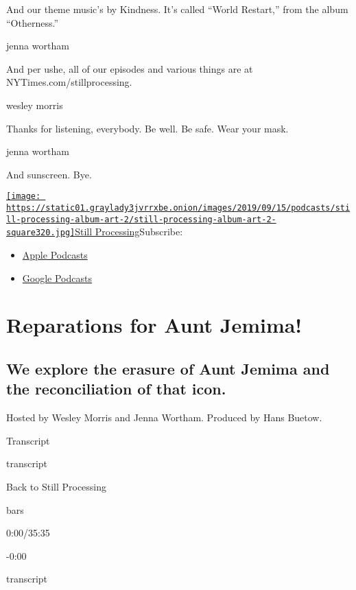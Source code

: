And our theme music's by Kindness. It's called ``World Restart,'' from
the album ``Otherness.''

jenna wortham

And per ushe, all of our episodes and various things are at
NYTimes.com/stillprocessing.

wesley morris

Thanks for listening, everybody. Be well. Be safe. Wear your mask.

jenna wortham

And sunscreen. Bye.

\href{https://www.nytimes3xbfgragh.onion/column/still-processing-podcast}{\texttt{[image: https://static01.graylady3jvrrxbe.onion/images/2019/09/15/podcasts/still-processing-album-art-2/still-processing-album-art-2-square320.jpg]}Still
Processing}Subscribe:

\begin{itemize}
\tightlist
\item
  \href{https://itunes.apple.com/us/podcast/id1151436460}{Apple
  Podcasts}
\item
  \href{https://www.google.com/podcasts?feed=aHR0cHM6Ly9yc3MuYXJ0MTkuY29tL255dC1zdGlsbC1wcm9jZXNzaW5n}{Google
  Podcasts}
\end{itemize}

\hypertarget{reparations-for-aunt-jemima-1}{%
\section{Reparations for Aunt
Jemima!}\label{reparations-for-aunt-jemima-1}}

\hypertarget{we-explore-the-erasure-of-aunt-jemima-and-the-reconciliation-of-that-icon-1}{%
\subsection{We explore the erasure of Aunt Jemima and the reconciliation
of that
icon.}\label{we-explore-the-erasure-of-aunt-jemima-and-the-reconciliation-of-that-icon-1}}

Hosted by Wesley Morris and Jenna Wortham. Produced by Hans Buetow.

Transcript

transcript

Back to Still Processing

bars

0:00/35:35

-0:00

transcript

